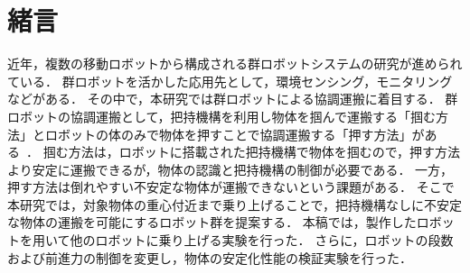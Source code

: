 \section{緒言}
近年，複数の移動ロボットから構成される群ロボットシステムの研究が進められている．
群ロボットを活かした応用先として，環境センシング，モニタリングなどがある．
その中で，本研究では群ロボットによる協調運搬に着目する．
群ロボットの協調運搬として，把持機構を利用し物体を掴んで運搬する「掴む方法」とロボットの体のみで物体を押すことで協調運搬する「押す方法」がある~\cite{swarmBot,push-only2}．
掴む方法は，ロボットに搭載された把持機構で物体を掴むので，押す方法より安定に運搬できるが，物体の認識と把持機構の制御が必要である．
一方，押す方法は倒れやすい不安定な物体が運搬できないという課題がある．
そこで本研究では，対象物体の重心付近まで乗り上げることで，把持機構なしに不安定な物体の運搬を可能にするロボット群を提案する．
本稿では，製作したロボットを用いて他のロボットに乗り上げる実験を行った．
さらに，ロボットの段数および前進力の制御を変更し，物体の安定化性能の検証実験を行った．
